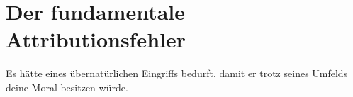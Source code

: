 \chapter{Der fundamentale Attributionsfehler}

\begin{chapterOpeningQuote}
Es hätte eines übernatürlichen Eingriffs bedurft, damit er trotz seines Umfelds deine Moral besitzen würde.
\end{chapterOpeningQuote}

